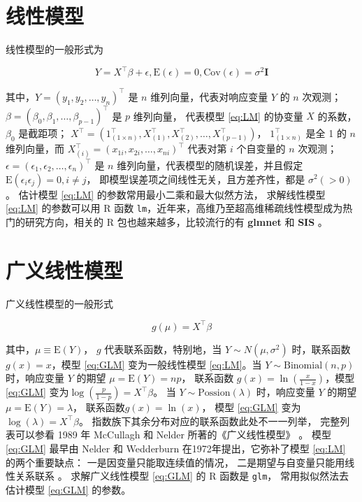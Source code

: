 \documentclass[12pt,a4paper,UTF8,twoside]{book}
\theoremstyle{definition}
\theoremstyle{definition}
\theoremstyle{definition}
\theoremstyle{remark}
\begin{document}
\hypertarget{Linear-Models}{%
\section{线性模型}\label{Linear-Models}}

线性模型的一般形式为

\begin{equation}
Y = X^{\top}\beta + \epsilon, \mathrm{E}(\epsilon) = 0, \mathrm{Cov}(\epsilon) = \sigma^2\mathbf{I}  \label{eq:LM}
\end{equation}

\noindent 其中，\(Y = (y_1,y_2,\ldots,y_n)^{\top}\) 是 \(n\)
维列向量，代表对响应变量 \(Y\) 的 \(n\) 次观测；
\(\beta = (\beta_0,\beta_1,\ldots,\beta_{p-1})^{\top}\) 是 \(p\)
维列向量， 代表模型 \eqref{eq:LM} 的协变量 \(X\) 的系数，\(\beta_0\)
是截距项；
\(X^{\top} = (1_{(1\times n)}^{\top},X_{(1)}^{\top},X_{(2)}^{\top},\ldots,X_{(p-1)}^{\top})\)，
\(1_{(1\times n)}^{\top}\) 是全 1 的 \(n\) 维列向量，而
\(X_{(i)}^{\top} = (x_{1i},x_{2i},\ldots,x_{ni})^{\top}\) 代表对第 \(i\)
个自变量的 \(n\) 次观测；
\(\epsilon = (\epsilon_1,\epsilon_2,\ldots,\epsilon_n)^{\top}\) 是 \(n\)
维列向量，代表模型的随机误差，并且假定
\(\mathrm{E}(\epsilon_i \epsilon_j) = 0, i \ne j\)，
即模型误差项之间线性无关，且方差齐性，都是 \(\sigma^2(>0)\)。 估计模型
\eqref{eq:LM} 的参数常用最小二乘和最大似然方法， 求解线性模型 \eqref{eq:LM}
的参数可以用 R 函数
\texttt{lm}，近年来，高维乃至超高维稀疏线性模型成为热门的研究方向，相关的
R 包也越来越多，比较流行的有 \textbf{glmnet} \citep{glmnet2011JSS} 和
\textbf{SIS} \citep{SIS2016JSS}。

\hypertarget{Generalized-Linear-Models}{%
\section{广义线性模型}\label{Generalized-Linear-Models}}

广义线性模型的一般形式

\begin{equation}
g(\mu) = X^{\top}\beta  \label{eq:GLM}
\end{equation}

\noindent 其中，\(\mu \equiv \mathrm{E}(Y)\)， \(g\)
代表联系函数，特别地，当 \(Y \sim N(\mu,\sigma^2)\) 时，联系函数
\(g(x) = x\)，模型 \eqref{eq:GLM} 变为一般线性模型 \eqref{eq:LM}。当
\(Y \sim \mathrm{Binomial}(n,p)\) 时，响应变量 \(Y\) 的期望
\(\mu =\mathrm{E}(Y) = np\)， 联系函数 \(g(x)=\ln(\frac{x}{1-x})\)，模型
\eqref{eq:GLM} 变为\(\log(\frac{p}{1-p})=X^{\top}\beta\)。 当
\(Y \sim \mathrm{Possion}(\lambda)\) 时，响应变量 \(Y\) 的期望
\(\mu =\mathrm{E}(Y) = \lambda\)， 联系函数\(g(x) = \ln(x)\)， 模型
\eqref{eq:GLM} 变为 \(\log(\lambda) = X^{\top}\beta\)。
指数族下其余分布对应的联系函数此处不一一列举， 完整列表可以参看 1989 年
McCullagh 和 Nelder 所著的《广义线性模型》 \citep{McCullagh1989}。 模型
\eqref{eq:GLM} 最早由 Nelder 和 Wedderburn
在1972年提出\citep{Nelder1972}，它弥补了模型 \eqref{eq:LM}
的两个重要缺点： 一是因变量只能取连续值的情况，
二是期望与自变量只能用线性关系联系 \citep{Chen2011}。 求解广义线性模型
\eqref{eq:GLM} 的 R 函数是 \texttt{glm}， 常用拟似然法去估计模型
\eqref{eq:GLM} 的参数。
\end{document}
